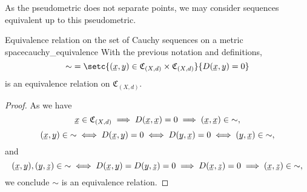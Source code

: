 As the pseudometric does not separate points, we may consider sequences equivalent up to this pseudometric.
\begin{lemma}{Equivalence relation on the set of Cauchy sequences on a metric space}{cauchy_equivalence}
    With the previous notation and definitions,
    \begin{equation*}
        {\sim} = \setc{(\sequnder{x},\sequnder{y}) \in \mathfrak{C}_{(X,d)} \times \mathfrak{C}_{(X,d)}}{D(\sequnder{x},\sequnder{y}) = 0}
    \end{equation*}
    is an equivalence relation on \(\mathfrak{C}_{(X,d)}\).
\end{lemma}
\begin{proof}
    As we have
    \begin{equation*}
        \sequnder{x} \in \mathfrak{C}_{(X,d)} \implies D(\sequnder{x},\sequnder{x}) = 0 \implies (\sequnder{x},\sequnder{x}) \in {\sim},
    \end{equation*}
    \begin{equation*}
        (\sequnder{x},\sequnder{y}) \in {\sim} \iff D(\sequnder{x},\sequnder{y}) = 0 \iff D(\sequnder{y},\sequnder{x}) = 0 \iff (\sequnder{y}, \sequnder{x}) \in {\sim},
    \end{equation*}
    and
    \begin{equation*}
        (\sequnder{x},\sequnder{y}), (\sequnder{y},\sequnder{z}) \in {\sim} \iff D(\sequnder{x},\sequnder{y}) = D(\sequnder{y},\sequnder{z}) = 0 \implies D(\sequnder{x},\sequnder{z}) = 0 \implies (\sequnder{x},\sequnder{z}) \in {\sim},
    \end{equation*}
    we conclude \({\sim}\) is an equivalence relation.
\end{proof}

